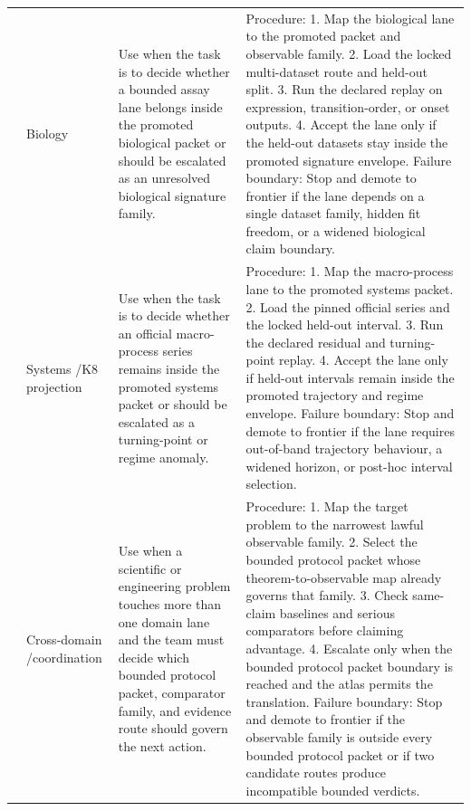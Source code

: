 \begin{longtable}{@{}L{0.15\textwidth}L{0.13\textwidth}L{0.18\textwidth}L{0.38\textwidth}@{}}
 & Biology & Use when the task is to decide whether a bounded assay lane belongs inside the promoted biological packet or should be escalated as an unresolved biological signature family. & Procedure: 1. Map the biological lane to the promoted packet and observable family. 2. Load the locked multi-dataset route and held-out split. 3. Run the declared replay on expression, transition-order, or onset outputs. 4. Accept the lane only if the held-out datasets stay inside the promoted signature envelope. \allowbreak Failure boundary: Stop and demote to frontier if the lane depends on a single dataset family, hidden fit freedom, or a widened biological claim boundary. \\
 & Systems /\allowbreak K8 projection & Use when the task is to decide whether an official macro-process series remains inside the promoted systems packet or should be escalated as a turning-point or regime anomaly. & Procedure: 1. Map the macro-process lane to the promoted systems packet. 2. Load the pinned official series and the locked held-out interval. 3. Run the declared residual and turning-point replay. 4. Accept the lane only if held-out intervals remain inside the promoted trajectory and regime envelope. \allowbreak Failure boundary: Stop and demote to frontier if the lane requires out-of-band trajectory behaviour, a widened horizon, or post-hoc interval selection. \\
 & Cross-domain /\allowbreak coordination & Use when a scientific or engineering problem touches more than one domain lane and the team must decide which bounded protocol packet, comparator family, and evidence route should govern the next action. & Procedure: 1. Map the target problem to the narrowest lawful observable family. 2. Select the bounded protocol packet whose theorem-to-observable map already governs that family. 3. Check same-claim baselines and serious comparators before claiming advantage. 4. Escalate only when the bounded protocol packet boundary is reached and the atlas permits the translation. \allowbreak Failure boundary: Stop and demote to frontier if the observable family is outside every bounded protocol packet or if two candidate routes produce incompatible bounded verdicts. \\
\bottomrule
\end{longtable}

